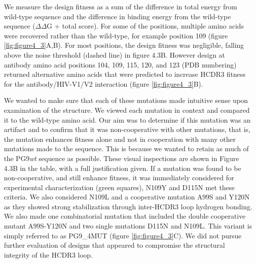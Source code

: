 We measure the design fitness as a sum of the difference in total energy from wild-type sequence and the difference in binding energy from the wild-type sequence ($\Delta\Delta$G + total score). For some of the positions, multiple amino acids were recovered rather than the wild-type, for example position 109 (figure \ref{fig:figure4_3}A,B). For most positions, the design fitness was negligible, falling above the noise threshold (dashed line) in figure 4.3B. However design at antibody amino acid positions 104, 109, 115, 120, and 123 (PDB numbering) returned alternative amino acids that were predicted to increase HCDR3 fitness for the antibody/HIV-V1/V2 interaction (figure \ref{fig:figure4_3}B).

We wanted to make sure that each of these mutations made intuitive sense upon examination of the structure. We viewed each mutation in context and compared it to the wild-type amino acid. Our aim was to determine if this mutation was an artifact and to confirm that it was non-cooperative with other mutations, that is, the mutation enhances fitness alone and not in cooperation with many other mutations made to the sequence. This is because we wanted to retain as much of the PG9\textit{wt} sequence as possible. These visual inspections are shown in Figure 4.3B in the table, with a full justification given. If a mutation was found to be non-cooperative, and still enhance fitness, it was immediately considered for experimental characterization (green squares), N109Y and D115N met these criteria. We also considered N109L and a cooperative mutation A99S and Y120N as they showed strong stabilization through inter-HCDR3 loop hydrogen bonding. We also made one combinatorial mutation that included the double cooperative mutant A99S-Y120N and two single mutations D115N and N109L. This variant is simply referred to as PG9\_4MUT (figure \ref{fig:figure4_3}C). We did not pursue further evaluation of designs that appeared to compromise the structural integrity of the HCDR3 loop.

